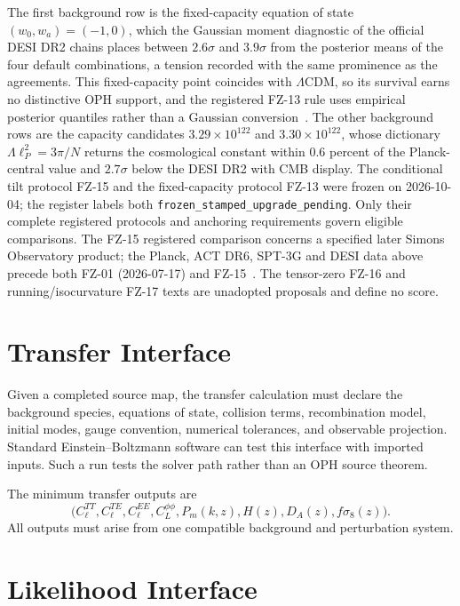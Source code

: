 \documentclass[11pt]{article}
\theoremstyle{remark}
\begin{document}
The first background row is the fixed-capacity equation of state
\((w_0,w_a)=(-1,0)\), which the Gaussian moment diagnostic of the official
DESI DR2 chains places between \(2.6\sigma\) and \(3.9\sigma\) from the
posterior means of the four default combinations, a tension recorded with
the same prominence as the agreements. This fixed-capacity point coincides
with \(\Lambda\)CDM, so its survival earns no distinctive OPH support, and
the registered FZ-13 rule uses empirical posterior quantiles rather than a
Gaussian conversion~\cite{ophladder}. The other background rows are the
capacity candidates
\(3.29\times10^{122}\) and \(3.30\times10^{122}\), whose dictionary
\(\Lambda\ell_P^2=3\pi/N\) returns the cosmological constant within
\(0.6\) percent of the Planck-central value and \(2.7\sigma\) below the DESI
DR2 with CMB display. The conditional tilt protocol FZ-15 and the
fixed-capacity protocol FZ-13 were frozen on 2026-10-04; the register labels
both \texttt{frozen\_stamped\_upgrade\_pending}. Only their complete
registered protocols and anchoring requirements govern eligible comparisons.
The FZ-15 registered comparison concerns a specified later Simons
Observatory product; the Planck, ACT DR6, SPT-3G and DESI data above precede
both FZ-01 (2026-07-17) and FZ-15~\cite{ophladder}.
The tensor-zero FZ-16 and running/isocurvature FZ-17 texts are unadopted
proposals and define no score.

\section{Transfer Interface}
\label{sec:transfer-interface}

Given a completed source map, the transfer calculation must declare the
background species, equations of state, collision terms, recombination model,
initial modes, gauge convention, numerical tolerances, and observable
projection. Standard Einstein--Boltzmann software can test this interface with
imported inputs. Such a run tests the solver path rather than an OPH source
theorem.

The minimum transfer outputs are
\begin{equation}
\bigl(C_\ell^{TT},C_\ell^{TE},C_\ell^{EE},C_L^{\phi\phi},
P_m(k,z),H(z),D_A(z),f\sigma_8(z)\bigr).
\end{equation}
All outputs must arise from one compatible background and perturbation system.

\section{Likelihood Interface}
\end{document}
